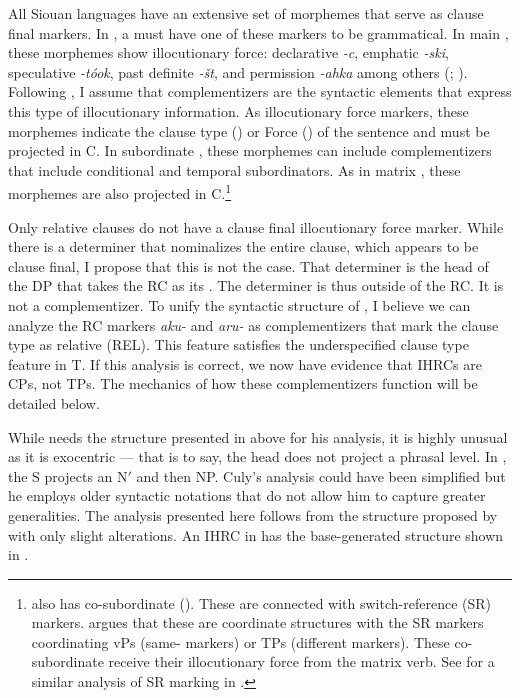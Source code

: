 \documentclass[output=paper]{LSP/langsci}
\begin{document}
	All Siouan languages have an extensive set of morphemes that serve as clause final markers. In , a  must have one of these markers to be grammatical. In main , these morphemes show illocutionary force: declarative \textit{-c}, emphatic \textit{-ski}, speculative \textit{-t\'ook}, past definite \textit{-\v{s}t}, and permission \textit{-ahka} among others (\citealt{Matthews1965}; \citealt{Boyle2007}). Following \citet{Rizzi1997}, I assume that complementizers are the syntactic elements that express this type of illocutionary information. As illocutionary force markers, these morphemes indicate the clause type (\citealt{Cheng1997}) or Force (\citealt{Chomsky1995}) of the sentence and must be projected in C. In subordinate , these morphemes can include complementizers that include conditional and temporal subordinators. As in matrix , these morphemes are also projected in C.\footnote{ also has co-subordinate  (\citealt{VanValinLaPolla1997}). These  are connected with switch-reference (SR) markers. \citet{Boyle2007} argues that these are coordinate structures with the SR markers coordinating vPs (same- markers) or TPs (different  markers). These co-subordinate  receive their illocutionary force from the matrix verb. See \citet{GordonTorres2012} for a similar analysis of SR marking in .}
	
Only relative clauses do not have a clause final illocutionary force marker.  While there is a determiner that nominalizes the entire clause, which appears to be clause final, I propose that this is not the case. That determiner is the head of the DP that takes the RC as its . The determiner is thus outside of the RC. It is not a complementizer. To unify the syntactic structure of , I believe we can analyze the RC markers \textit{aku-} and \textit{aru-} as complementizers that mark the clause type as relative (REL). This feature satisfies the underspecified clause type feature in T. If this analysis is correct, we now have evidence that IHRCs are CPs, not TPs. The mechanics of how these complementizers function will be detailed below.   
	
While \citeauthor{Culy1990} needs the structure presented in  above for his analysis, it is highly unusual as it is exocentric --- that is to say, the head does not project a phrasal level. In , the S projects an N$'$ and then NP. Culy's analysis could have been simplified but he employs older syntactic notations that do not allow him to capture greater generalities. The analysis presented here follows from the structure proposed by \citeauthor{Williamson1987} with only slight alterations. An IHRC in  has the base-generated structure shown in . 
\end{document}
